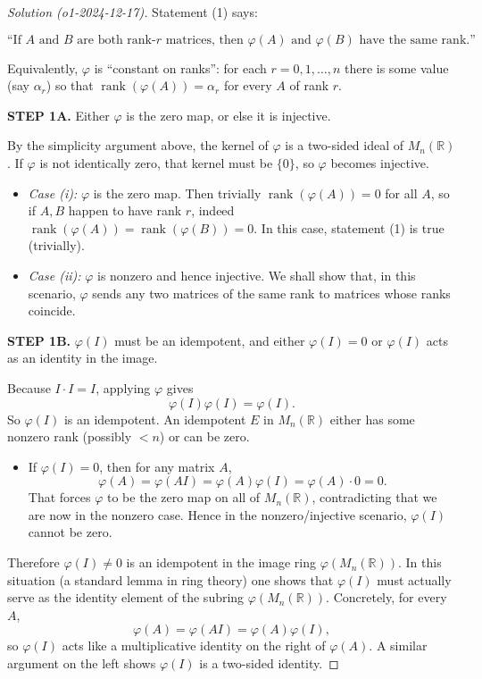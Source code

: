 \documentclass[11pt]{article}
\numberwithin{equation}{section}
\begin{document}
\begin{proof}[Solution (o1-2024-12-17)]
Statement (1) says:

\[
\text{``If $A$ and $B$ are both rank-$r$ matrices, then $\varphi(A)$ and $\varphi(B)$ have the same rank.''}
\]

Equivalently, $\varphi$ is ``constant on ranks'': for each $r=0,1,\dots,n$ there is some value (say $\alpha_r$) so that $\operatorname{rank}(\varphi(A))=\alpha_r$ for every $A$ of rank $r$.

\textbf{STEP 1A.}  Either $\varphi$ is the zero map, or else it is injective.

By the simplicity argument above, the kernel of $\varphi$ is a two-sided ideal of $M_n(\mathbb{R})$.  If $\varphi$ is not identically zero, that kernel must be $\{0\}$, so $\varphi$ becomes injective.

\begin{itemize}
\item \textit{Case (i):} $\varphi$ is the zero map.  
Then trivially $\operatorname{rank}(\varphi(A))=0$ for all $A$, so if $A,B$ happen to have rank $r$, indeed $\operatorname{rank}(\varphi(A))=\operatorname{rank}(\varphi(B))=0$.  In this case, statement (1) is true (trivially).

\item \textit{Case (ii):} $\varphi$ is nonzero and hence injective.  
We shall show that, in this scenario, $\varphi$ sends any two matrices of the same rank to matrices whose ranks coincide.
\end{itemize}

\textbf{STEP 1B.} $\varphi(I)$ must be an idempotent, and either $\varphi(I)=0$ or $\varphi(I)$ acts as an identity in the image.

Because $I\cdot I = I$, applying $\varphi$ gives 
\[
\varphi(I)\varphi(I)=\varphi(I).
\]
So $\varphi(I)$ is an idempotent.  An idempotent $E$ in $M_n(\mathbb{R})$ either has some nonzero rank (possibly $<n$) or can be zero.

\begin{itemize}
\item If $\varphi(I)=0$, then for any matrix $A$,
\[
\varphi(A)=\varphi(AI)=\varphi(A)\varphi(I)=\varphi(A)\cdot 0=0.
\]
That forces $\varphi$ to be the zero map on all of $M_n(\mathbb{R})$, contradicting that we are now in the nonzero case.  Hence in the nonzero/injective scenario, $\varphi(I)$ cannot be zero.
\end{itemize}

Therefore $\varphi(I)\neq 0$ is an idempotent in the image ring $\varphi(M_n(\mathbb{R}))$.  In this situation (a standard lemma in ring theory) one shows that $\varphi(I)$ must actually serve as the identity element of the subring $\varphi(M_n(\mathbb{R}))$.  Concretely, for every $A$,
\[
\varphi(A)=\varphi(AI)=\varphi(A)\varphi(I),
\]
so $\varphi(I)$ acts like a multiplicative identity on the right of $\varphi(A)$.  A similar argument on the left shows $\varphi(I)$ is a two-sided identity.


\end{proof}
\end{document}
